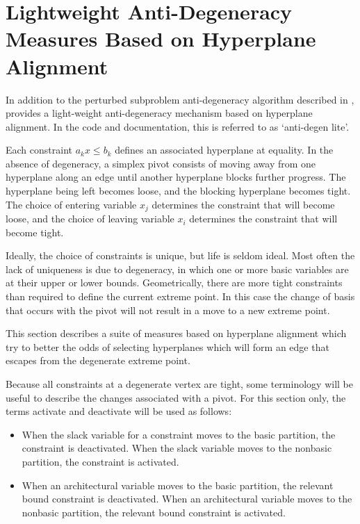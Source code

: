 \section{Lightweight Anti-Degeneracy Measures Based on Hyperplane Alignment}
\label{sec:AntiDegenLite}

\newcommand{\nblb}{\,\underline{\makebox[\width-3pt][c]{$\scriptstyle \,N$}}}
\newcommand{\nbub}{\;\overline{\makebox[\width-3pt][c]{$\scriptstyle N\,$}}}

In addition to the perturbed subproblem anti-degeneracy algorithm described in
, \dylp provides a light-weight
anti-degeneracy mechanism based on hyperplane alignment.
In the code and documentation, this is referred to as `anti-degen lite'.

Each constraint $a_k x \leq b_k$ defines an associated hyperplane at equality.
In the absence of degeneracy, a simplex pivot consists of moving away from one
hyperplane along an edge until another hyperplane blocks further progress.
The hyperplane being left becomes loose, and the blocking hyperplane becomes
tight.
The choice of entering variable $x_j$ determines the constraint that will
become loose,
and the choice of leaving variable $x_i$ determines the
constraint that will become tight.

Ideally, the choice of constraints is unique, but life is seldom ideal.
Most often the lack of uniqueness is due to degeneracy, in which one
or more basic variables are at their upper or lower bounds.
Geometrically, there are more tight constraints than required to define the
current extreme point.
In this case the change of basis that occurs with the pivot will not result in
a move to a new extreme point.

This section describes a suite of measures based on hyperplane alignment which
try to better the odds of selecting hyperplanes which will form an edge that
escapes from the degenerate extreme point.

Because all constraints at a degenerate vertex are tight, some terminology will
be useful to describe the changes associated with a pivot.
For this section only, the terms activate and deactivate will be used as
follows:
\begin{itemize}
  \item
  When the slack variable for a constraint moves to the basic partition, the
  constraint is deactivated.
  When the slack variable moves to the nonbasic partition, the constraint is
  activated.

  \item
  When an architectural variable moves to the basic partition, the relevant
  bound constraint is deactivated.
  When an architectural variable moves to the nonbasic partition, the
  relevant bound constraint is activated.
\end{itemize}


